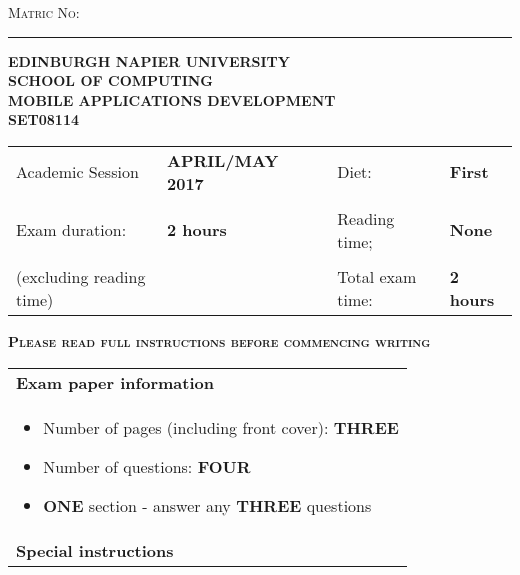 \documentclass[12pt, a4paper, twosize]{article}
\newcommand{\blank}[1]{\hspace*{#1}}
\newcommand*{\inputline}[1][3em]{\rule[0.5ex]{#1}{0.55pt}}
\begin{document}
\begin{titlepage}
\vspace*{0.2cm}

\textsc{Matric No:} \inputline[10em]

\begin{center}

\textsc{ {\bf{EDINBURGH NAPIER UNIVERSITY}}}\\[0.5cm]
\textsc{ {\bf{SCHOOL OF COMPUTING}}}\\[1.1cm]


\textsc{ {\bf{MOBILE APPLICATIONS DEVELOPMENT}}}\\[1cm]
\textsc{ {\bf{SET08114}}}\\[1.5cm]

\end{center}

\begin{table}[H]
\centering
\begin{tabular}{lllll}
Academic Session         & \textbf{APRIL/MAY 2017} &  \blank{1cm} & Diet:& \textbf{First}   \\
     & & & \\
Exam duration:           & \textbf{2 hours} &  & Reading time;    & \textbf{None}    \\
     & & & \\
(excluding reading time) &                  &  & Total exam time: & \textbf{2 hours}
\end{tabular}
\end{table}

\vspace{1.8cm}
\textsc{{\bf{Please read full instructions before commencing writing}}}

\begin{table}[H]
\centering
\begin{tabular}{|p{14cm}|}
\hline

{\bf{Exam paper information}}\\[-0.5cm]

    \begin{itemize}
      \item Number of pages (including front cover): {\bf{THREE}}
      \item Number of questions: {\bf{FOUR}}
      \item {\bf{ONE}} section - answer any {\bf{THREE}} questions
    \end{itemize} \\[-0.5cm]

\hline
{\bf{Special instructions}}\\[-0.5cm]


\end{tabular}
\end{table}
\end{titlepage}
\end{document}
